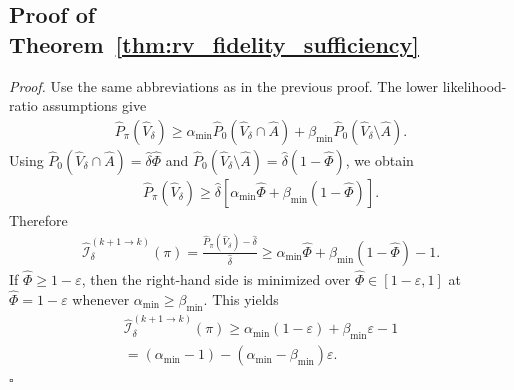 \documentclass[
  aps,
  prresearch,
  reprint,
  amsmath,
  amssymb,
  superscriptaddress,
  nofootinbib,
  longbibliography
]{revtex4-2}
\def\EQSP{3pt}
\newcommand{\cgather}[2][\EQSP]{\begingroup\setlength\abovedisplayskip{#1}\setlength\belowdisplayskip{#1}\begin{gather} #2 \end{gather}\endgroup\noindent}
\newcommand{\calI}{\mathcal{I}}
\begin{document}
\subsection{Proof of Theorem~\ref{thm:rv_fidelity_sufficiency}}

\noindent\emph{Proof.}
Use the same abbreviations as in the previous proof. The lower likelihood-ratio assumptions give
\cgather{
    \widehat P_\pi(\widehat V_\delta)
    \geq
    \alpha_{\min}\widehat P_0(\widehat V_\delta\cap\widehat A)
    +
    \beta_{\min}\widehat P_0(\widehat V_\delta\setminus\widehat A).
}
Using
\(\widehat P_0(\widehat V_\delta\cap\widehat A)=\widehat\delta\widehat\Phi\)
and
\(\widehat P_0(\widehat V_\delta\setminus\widehat A)=\widehat\delta(1-\widehat\Phi)\),
we obtain
\cgather{
    \widehat P_\pi(\widehat V_\delta)
    \geq
    \widehat\delta
    \left[
    \alpha_{\min}\widehat\Phi
    +
    \beta_{\min}(1-\widehat\Phi)
    \right].
}
Therefore
\cgather{
    \widehat{\calI}_\delta^{(k+1\to k)}(\pi)
    =
    \frac{\widehat P_\pi(\widehat V_\delta)-\widehat\delta}{\widehat\delta}
    \geq
    \alpha_{\min}\widehat\Phi
    +
    \beta_{\min}(1-\widehat\Phi)
    -1.
}
If \(\widehat\Phi\geq1-\varepsilon\), then the right-hand side is minimized over \(\widehat\Phi\in[1-\varepsilon,1]\) at \(\widehat\Phi=1-\varepsilon\) whenever \(\alpha_{\min}\geq\beta_{\min}\). This yields
\cgather{
    \widehat{\calI}_\delta^{(k+1\to k)}(\pi)
    \geq
    \alpha_{\min}(1-\varepsilon)+\beta_{\min}\varepsilon-1\\
    =
    (\alpha_{\min}-1)-(\alpha_{\min}-\beta_{\min})\varepsilon.
}
\(\square\)
\end{document}
